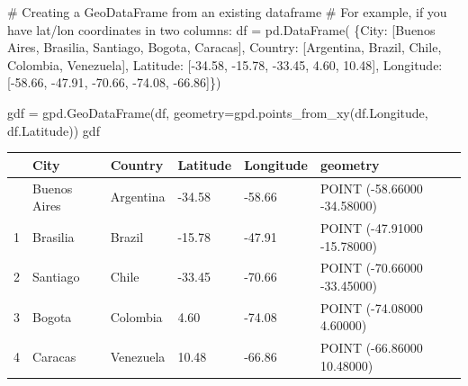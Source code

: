 \documentclass[
  letterpaper,
  DIV=11,
  numbers=noendperiod]{scrreprt}
\newenvironment{Shaded}{\begin{snugshade}}{\end{snugshade}}
\newcommand{\CommentTok}[1]{\textcolor[rgb]{0.37,0.37,0.37}{#1}}
\newcommand{\FloatTok}[1]{\textcolor[rgb]{0.68,0.00,0.00}{#1}}
\newcommand{\NormalTok}[1]{\textcolor[rgb]{0.00,0.23,0.31}{#1}}
\newcommand{\OperatorTok}[1]{\textcolor[rgb]{0.37,0.37,0.37}{#1}}
\newcommand{\StringTok}[1]{\textcolor[rgb]{0.13,0.47,0.30}{#1}}
\begin{document}
\begin{Shaded}
\begin{Highlighting}[]
\CommentTok{\# Creating a GeoDataFrame from an existing dataframe}
\CommentTok{\# For example, if you have lat/lon coordinates in two columns:}
\NormalTok{df }\OperatorTok{=}\NormalTok{ pd.DataFrame(}
\NormalTok{    \{}\StringTok{\textquotesingle{}City\textquotesingle{}}\NormalTok{: [}\StringTok{\textquotesingle{}Buenos Aires\textquotesingle{}}\NormalTok{, }\StringTok{\textquotesingle{}Brasilia\textquotesingle{}}\NormalTok{, }\StringTok{\textquotesingle{}Santiago\textquotesingle{}}\NormalTok{, }\StringTok{\textquotesingle{}Bogota\textquotesingle{}}\NormalTok{, }\StringTok{\textquotesingle{}Caracas\textquotesingle{}}\NormalTok{],}
     \StringTok{\textquotesingle{}Country\textquotesingle{}}\NormalTok{: [}\StringTok{\textquotesingle{}Argentina\textquotesingle{}}\NormalTok{, }\StringTok{\textquotesingle{}Brazil\textquotesingle{}}\NormalTok{, }\StringTok{\textquotesingle{}Chile\textquotesingle{}}\NormalTok{, }\StringTok{\textquotesingle{}Colombia\textquotesingle{}}\NormalTok{, }\StringTok{\textquotesingle{}Venezuela\textquotesingle{}}\NormalTok{],}
     \StringTok{\textquotesingle{}Latitude\textquotesingle{}}\NormalTok{: [}\OperatorTok{{-}}\FloatTok{34.58}\NormalTok{, }\OperatorTok{{-}}\FloatTok{15.78}\NormalTok{, }\OperatorTok{{-}}\FloatTok{33.45}\NormalTok{, }\FloatTok{4.60}\NormalTok{, }\FloatTok{10.48}\NormalTok{],}
     \StringTok{\textquotesingle{}Longitude\textquotesingle{}}\NormalTok{: [}\OperatorTok{{-}}\FloatTok{58.66}\NormalTok{, }\OperatorTok{{-}}\FloatTok{47.91}\NormalTok{, }\OperatorTok{{-}}\FloatTok{70.66}\NormalTok{, }\OperatorTok{{-}}\FloatTok{74.08}\NormalTok{, }\OperatorTok{{-}}\FloatTok{66.86}\NormalTok{]\})}
\end{Highlighting}
\end{Shaded}

\begin{Shaded}
\begin{Highlighting}[]
\NormalTok{gdf }\OperatorTok{=}\NormalTok{ gpd.GeoDataFrame(df, geometry}\OperatorTok{=}\NormalTok{gpd.points\_from\_xy(df.Longitude, df.Latitude))}
\NormalTok{gdf}
\end{Highlighting}
\end{Shaded}

\begin{longtable}[]{@{}llllll@{}}
\toprule\noalign{}
& City & Country & Latitude & Longitude & geometry \\
\midrule\noalign{}
\endhead
\bottomrule\noalign{}
\endlastfoot
0 & Buenos Aires & Argentina & -34.58 & -58.66 & POINT (-58.66000
-34.58000) \\
1 & Brasilia & Brazil & -15.78 & -47.91 & POINT (-47.91000 -15.78000) \\
2 & Santiago & Chile & -33.45 & -70.66 & POINT (-70.66000 -33.45000) \\
3 & Bogota & Colombia & 4.60 & -74.08 & POINT (-74.08000 4.60000) \\
4 & Caracas & Venezuela & 10.48 & -66.86 & POINT (-66.86000 10.48000) \\
\end{longtable}
\end{document}
